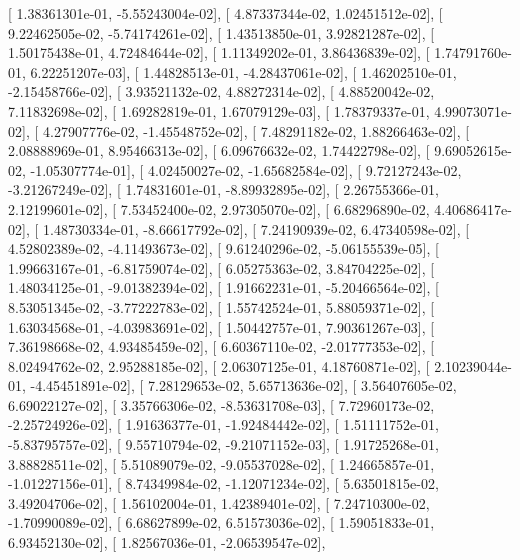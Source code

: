 \documentclass{article}
\begin{document}
       [  1.38361301e-01,  -5.55243004e-02],
       [  4.87337344e-02,   1.02451512e-02],
       [  9.22462505e-02,  -5.74174261e-02],
       [  1.43513850e-01,   3.92821287e-02],
       [  1.50175438e-01,   4.72484644e-02],
       [  1.11349202e-01,   3.86436839e-02],
       [  1.74791760e-01,   6.22251207e-03],
       [  1.44828513e-01,  -4.28437061e-02],
       [  1.46202510e-01,  -2.15458766e-02],
       [  3.93521132e-02,   4.88272314e-02],
       [  4.88520042e-02,   7.11832698e-02],
       [  1.69282819e-01,   1.67079129e-03],
       [  1.78379337e-01,   4.99073071e-02],
       [  4.27907776e-02,  -1.45548752e-02],
       [  7.48291182e-02,   1.88266463e-02],
       [  2.08888969e-01,   8.95466313e-02],
       [  6.09676632e-02,   1.74422798e-02],
       [  9.69052615e-02,  -1.05307774e-01],
       [  4.02450027e-02,  -1.65682584e-02],
       [  9.72127243e-02,  -3.21267249e-02],
       [  1.74831601e-01,  -8.89932895e-02],
       [  2.26755366e-01,   2.12199601e-02],
       [  7.53452400e-02,   2.97305070e-02],
       [  6.68296890e-02,   4.40686417e-02],
       [  1.48730334e-01,  -8.66617792e-02],
       [  7.24190939e-02,   6.47340598e-02],
       [  4.52802389e-02,  -4.11493673e-02],
       [  9.61240296e-02,  -5.06155539e-05],
       [  1.99663167e-01,  -6.81759074e-02],
       [  6.05275363e-02,   3.84704225e-02],
       [  1.48034125e-01,  -9.01382394e-02],
       [  1.91662231e-01,  -5.20466564e-02],
       [  8.53051345e-02,  -3.77222783e-02],
       [  1.55742524e-01,   5.88059371e-02],
       [  1.63034568e-01,  -4.03983691e-02],
       [  1.50442757e-01,   7.90361267e-03],
       [  7.36198668e-02,   4.93485459e-02],
       [  6.60367110e-02,  -2.01777353e-02],
       [  8.02494762e-02,   2.95288185e-02],
       [  2.06307125e-01,   4.18760871e-02],
       [  2.10239044e-01,  -4.45451891e-02],
       [  7.28129653e-02,   5.65713636e-02],
       [  3.56407605e-02,   6.69022127e-02],
       [  3.35766306e-02,  -8.53631708e-03],
       [  7.72960173e-02,  -2.25724926e-02],
       [  1.91636377e-01,  -1.92484442e-02],
       [  1.51111752e-01,  -5.83795757e-02],
       [  9.55710794e-02,  -9.21071152e-03],
       [  1.91725268e-01,   3.88828511e-02],
       [  5.51089079e-02,  -9.05537028e-02],
       [  1.24665857e-01,  -1.01227156e-01],
       [  8.74349984e-02,  -1.12071234e-02],
       [  5.63501815e-02,   3.49204706e-02],
       [  1.56102004e-01,   1.42389401e-02],
       [  7.24710300e-02,  -1.70990089e-02],
       [  6.68627899e-02,   6.51573036e-02],
       [  1.59051833e-01,   6.93452130e-02],
       [  1.82567036e-01,  -2.06539547e-02],
\end{document}
